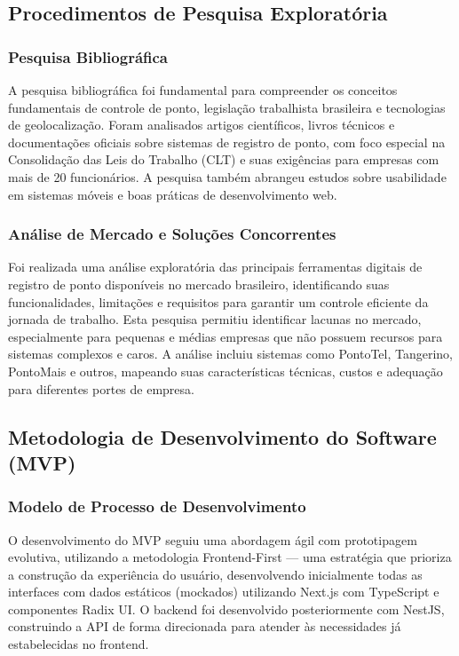 \subsection{Procedimentos de Pesquisa Exploratória}

\subsubsection{Pesquisa Bibliográfica} 

A pesquisa bibliográfica foi fundamental para compreender os conceitos fundamentais de controle de ponto, legislação trabalhista brasileira e tecnologias de geolocalização. Foram analisados artigos científicos, livros técnicos e documentações oficiais sobre sistemas de registro de ponto, com foco especial na Consolidação das Leis do Trabalho (CLT) e suas exigências para empresas com mais de 20 funcionários. A pesquisa também abrangeu estudos sobre usabilidade em sistemas móveis e boas práticas de desenvolvimento web.

\subsubsection{Análise de Mercado e Soluções Concorrentes}

Foi realizada uma análise exploratória das principais ferramentas digitais de registro de ponto disponíveis no mercado brasileiro, identificando suas funcionalidades, limitações e requisitos para garantir um controle eficiente da jornada de trabalho. Esta pesquisa permitiu identificar lacunas no mercado, especialmente para pequenas e médias empresas que não possuem recursos para sistemas complexos e caros. A análise incluiu sistemas como PontoTel, Tangerino, PontoMais e outros, mapeando suas características técnicas, custos e adequação para diferentes portes de empresa.

\subsection{Metodologia de Desenvolvimento do Software (MVP)}

\subsubsection{Modelo de Processo de Desenvolvimento}

O desenvolvimento do MVP seguiu uma abordagem ágil com prototipagem evolutiva, utilizando a metodologia Frontend-First — uma estratégia que prioriza a construção da experiência do usuário, desenvolvendo inicialmente todas as interfaces com dados estáticos (mockados) utilizando Next.js com TypeScript e componentes Radix UI. O backend foi desenvolvido posteriormente com NestJS, construindo a API de forma direcionada para atender às necessidades já estabelecidas no frontend.

